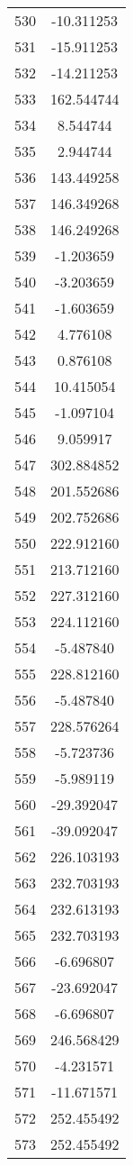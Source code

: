 \documentclass[12pt]{article}
\begin{document}
\begin{longtable}{@{}cc@{}}
530 & -10.311253 \\
531 & -15.911253 \\
532 & -14.211253 \\
533 & 162.544744 \\
534 & 8.544744 \\
535 & 2.944744 \\
536 & 143.449258 \\
537 & 146.349268 \\
538 & 146.249268 \\
539 & -1.203659 \\
540 & -3.203659 \\
541 & -1.603659 \\
542 & 4.776108 \\
543 & 0.876108 \\
544 & 10.415054 \\
545 & -1.097104 \\
546 & 9.059917 \\
547 & 302.884852 \\
548 & 201.552686 \\
549 & 202.752686 \\
550 & 222.912160 \\
551 & 213.712160 \\
552 & 227.312160 \\
553 & 224.112160 \\
554 & -5.487840 \\
555 & 228.812160 \\
556 & -5.487840 \\
557 & 228.576264 \\
558 & -5.723736 \\
559 & -5.989119 \\
560 & -29.392047 \\
561 & -39.092047 \\
562 & 226.103193 \\
563 & 232.703193 \\
564 & 232.613193 \\
565 & 232.703193 \\
566 & -6.696807 \\
567 & -23.692047 \\
568 & -6.696807 \\
569 & 246.568429 \\
570 & -4.231571 \\
571 & -11.671571 \\
572 & 252.455492 \\
573 & 252.455492 \\

\end{longtable}
\end{document}
